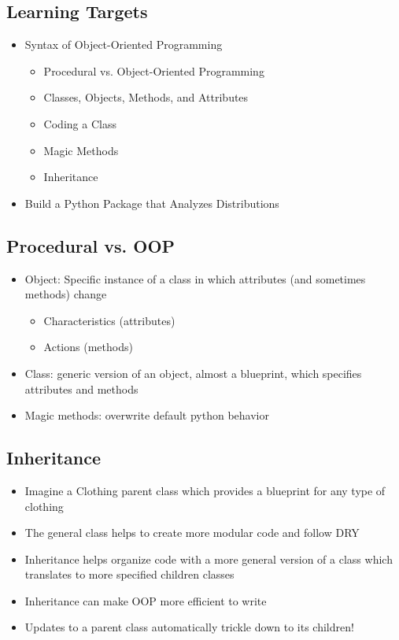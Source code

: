 
\subsection{Learning Targets}
\begin{itemize}
	\item Syntax of Object-Oriented Programming
	\begin{itemize}
		\item Procedural vs. Object-Oriented Programming
		\item Classes, Objects, Methods, and Attributes
		\item Coding a Class
		\item Magic Methods
		\item Inheritance
	\end{itemize}
	\item Build a Python Package that Analyzes Distributions
\end{itemize}

\subsection{Procedural vs. OOP}
\begin{itemize}
	\item Object: Specific instance of a class in which attributes (and sometimes methods) change
	\begin{itemize}
		\item Characteristics (attributes)
		\item Actions (methods)
	\end{itemize}
	\item Class: generic version of an object, almost a blueprint, which specifies attributes and methods
	\item Magic methods: overwrite default python behavior
\end{itemize}

\subsection{Inheritance}
\begin{itemize}
	\item Imagine a Clothing parent class which provides a blueprint for any type of clothing
	\item The general class helps to create more modular code and follow DRY
	\item Inheritance helps organize code with a more general version of a class which translates to more specified children classes
	\item Inheritance can make OOP more efficient to write
	\item Updates to a parent class automatically trickle down to its children!
\end{itemize}

